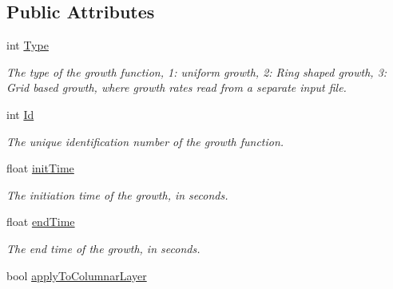 \subsection*{Public Attributes}
\begin{DoxyCompactItemize}
\item 
\hypertarget{classGrowthFunctionBase_a90fc4b14e2adcda0930fe93b1490fb7a}{}int \hyperlink{classGrowthFunctionBase_a90fc4b14e2adcda0930fe93b1490fb7a}{Type}\label{classGrowthFunctionBase_a90fc4b14e2adcda0930fe93b1490fb7a}

\begin{DoxyCompactList}\small\item\em The type of the growth function, 1\+: uniform growth, 2\+: Ring shaped growth, 3\+: Grid based growth, where growth rates read from a separate input file. \end{DoxyCompactList}\item 
\hypertarget{classGrowthFunctionBase_aa669a940ab77009f9b2b9c9885e9cd9e}{}int \hyperlink{classGrowthFunctionBase_aa669a940ab77009f9b2b9c9885e9cd9e}{Id}\label{classGrowthFunctionBase_aa669a940ab77009f9b2b9c9885e9cd9e}

\begin{DoxyCompactList}\small\item\em The unique identification number of the growth function. \end{DoxyCompactList}\item 
\hypertarget{classGrowthFunctionBase_ae92513a7b41637df8e26e7db35ddf97c}{}float \hyperlink{classGrowthFunctionBase_ae92513a7b41637df8e26e7db35ddf97c}{init\+Time}\label{classGrowthFunctionBase_ae92513a7b41637df8e26e7db35ddf97c}

\begin{DoxyCompactList}\small\item\em The initiation time of the growth, in seconds. \end{DoxyCompactList}\item 
\hypertarget{classGrowthFunctionBase_a3ff4db0573d354a75666a5f3ca446941}{}float \hyperlink{classGrowthFunctionBase_a3ff4db0573d354a75666a5f3ca446941}{end\+Time}\label{classGrowthFunctionBase_a3ff4db0573d354a75666a5f3ca446941}

\begin{DoxyCompactList}\small\item\em The end time of the growth, in seconds. \end{DoxyCompactList}\item 
\hypertarget{classGrowthFunctionBase_a3d56771e7c145589a14e11cc331e0326}{}bool \hyperlink{classGrowthFunctionBase_a3d56771e7c145589a14e11cc331e0326}{apply\+To\+Columnar\+Layer}\label{classGrowthFunctionBase_a3d56771e7c145589a14e11cc331e0326}


\end{DoxyCompactItemize}
